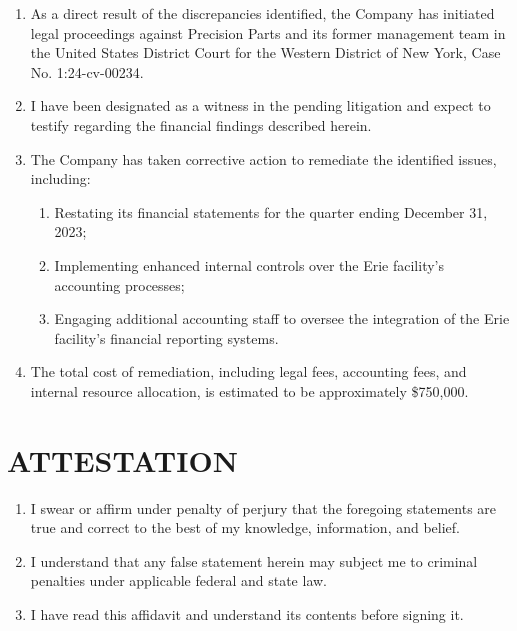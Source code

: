 \documentclass[
    language=english,
    doctype=affidavit,
    institution=none,
]{../../omnilatex}
\begin{document}
\begin{enumerate}[resume]
    \item As a direct result of the discrepancies identified, the Company has initiated legal proceedings against Precision Parts and its former management team in the United States District Court for the Western District of New York, Case No. 1:24-cv-00234.

    \item I have been designated as a witness in the pending litigation and expect to testify regarding the financial findings described herein.

    \item The Company has taken corrective action to remediate the identified issues, including:
    \begin{enumerate}[label=(\alph*)]
        \item Restating its financial statements for the quarter ending December 31, 2023;
        \item Implementing enhanced internal controls over the Erie facility's accounting processes;
        \item Engaging additional accounting staff to oversee the integration of the Erie facility's financial reporting systems.
    \end{enumerate}

    \item The total cost of remediation, including legal fees, accounting fees, and internal resource allocation, is estimated to be approximately \$750,000.
\end{enumerate}

\section{ATTESTATION}

\begin{enumerate}[resume]
    \item I swear or affirm under penalty of perjury that the foregoing statements are true and correct to the best of my knowledge, information, and belief.
    \item I understand that any false statement herein may subject me to criminal penalties under applicable federal and state law.
    \item I have read this affidavit and understand its contents before signing it.
\end{enumerate}

\vspace{2cm}
\end{document}
